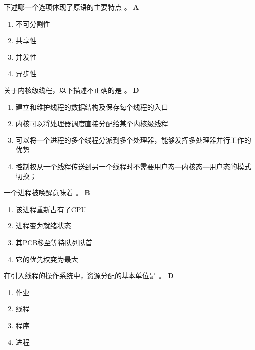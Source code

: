 \begin{problem}
	下述哪一个选项体现了原语的主要特点 \myline。
	\textbf{A}
	\vspace{-0.5em}
	\begin{multicols}{4}
		\begin{enumerate}[label=\Alph*.]
			\item 不可分割性
			\item 共享性
			\item 并发性
			\item 异步性
		\end{enumerate}
	\end{multicols}
	\vspace{-1em}
\end{problem}


\begin{problem}
	‌关于内核级线程，以下描述不正确的是 \myline。
	\textbf{D}
		\begin{enumerate}[label=\Alph*.]
			\item 建立和维护线程的数据结构及保存每个线程的入口
			\item 内核可以将处理器调度直接分配给某个内核级线程
			\item 可以将一个进程的多个线程分派到多个处理器，能够发挥多处理器并行工作的优势
			\item 控制权从一个线程传送到另一个线程时不需要用户态—内核态—用户态的模式切换；
		\end{enumerate}
\end{problem}


\begin{problem}
	一个进程被唤醒意味着 \myline。
	\textbf{B}
	\vspace{-0.5em}
	\begin{multicols}{2}
		\begin{enumerate}[label=\Alph*.]
			\item 该进程重新占有了CPU
			\item 进程变为就绪状态
			\item 其PCB移至等待队列队首
			\item 它的优先权变为最大
		\end{enumerate}
	\end{multicols}
	\vspace{-1em}
\end{problem}


\begin{problem}
	在引入线程的操作系统中，资源分配的基本单位是 \myline。
	\textbf{D}
	\vspace{-0.5em}
	\begin{multicols}{4}
		\begin{enumerate}[label=\Alph*.]
			\item 作业
			\item 线程
			\item 程序
			\item 进程
		\end{enumerate}
	\end{multicols}
	\vspace{-1em}
\end{problem}



